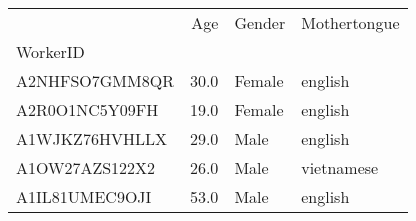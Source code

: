 \begin{table}
\centering
\label{fig::worker_sample}
\begin{tabular}{lrll}
\toprule
{} &   Age &  Gender & Mothertongue \\
WorkerID       &       &         &              \\
\midrule
A2NHFSO7GMM8QR &  30.0 &  Female &      english \\
A2R0O1NC5Y09FH &  19.0 &  Female &      english \\
A1WJKZ76HVHLLX &  29.0 &    Male &      english \\
A1OW27AZS122X2 &  26.0 &    Male &   vietnamese \\
A1IL81UMEC9OJI &  53.0 &    Male &      english \\
\bottomrule
\end{tabular}
\end{table}
